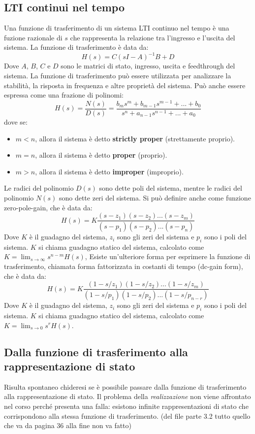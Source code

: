 \subsection{LTI continui nel tempo}
Una funzione di trasferimento di un sistema LTI continuo nel tempo è una
fuzione razionale di $s$ che rappresenta la relazione tra l'ingresso e l'uscita
del sistema. La funzione di trasferimento è data da:
\begin{equation}
    H(s) = C (sI - A)^{-1} B + D
\end{equation}
Dove $A$, $B$, $C$ e $D$ sono le matrici di stato, ingresso, uscita e
feedthrough del sistema. La funzione di trasferimento può essere utilizzata per
analizzare la stabilità, la risposta in frequenza e altre proprietà del sistema.
Può anche essere espressa come una frazione di polinomi:
\begin{equation}
    H(s) = \frac{N(s)}{D(s)} = \frac{b_m s^m + b_{m-1} s^{m-1} + ... + b_0}{s^n + a_{n-1} s^{n-1} + ... + a_0}
\end{equation}
dove se:
\begin{itemize}
    \item $m < n$, allora il sistema è detto \textbf{strictly proper} (strettamente
          proprio).
    \item $m = n$, allora il sistema è detto \textbf{proper} (proprio).
    \item $m > n$, allora il sistema è detto \textbf{improper} (improprio).
\end{itemize}
Le radici del polinomio $D(s)$ sono dette poli del sistema, mentre le radici del polinomio $N(s)$ sono dette zeri del sistema.
Si può definire anche come funzione zero-pole-gain, che è data da:
\begin{equation}
    H(s) = K \frac{(s-z_1)(s-z_2)...(s-z_m)}{(s-p_1)(s-p_2)...(s-p_n)}
\end{equation}
Dove $K$ è il guadagno del sistema, $z_i$ sono gli zeri del sistema e $p_i$ sono i poli del sistema.
$K$ si chiama guadagno statico del sistema, calcolato come $K = \lim_{s \to \infty} s^{n-m}H(s)$,
Esiste un'ulteriore forma per esprimere la funzione di trasferimento, chiamata forma fattorizzata in costanti di tempo (dc-gain form), che è data da:
\begin{equation}
    H(s) = K \frac{(1-s/z_1)(1-s/z_2)...(1-s/z_m)}{(1-s/p_1)(1-s/p_2)...(1-s/p_{n-r})}
\end{equation}
Dove $K$ è il guadagno del sistema, $z_i$ sono gli zeri del sistema e $p_i$ sono i poli del sistema.
$K$ si chiama guadagno statico del sistema, calcolato come $K = \lim_{s \to 0} s^r H(s)$.
\subsection{Dalla funzione di trasferimento alla rappresentazione di stato}
Risulta spontaneo chideresi se è possibile passare dalla funzione di
trasferimento alla rappresentazione di stato. Il problema della
\textit{realizzazione} non viene affrontato nel corso perché presenta una
falla: esistono infinite rappresentazioni di stato che corrispondono alla
stessa funzione di trasferimento. (del file parte 3.2 tutto quello che va da
pagina 36 alla fine non va fatto)
